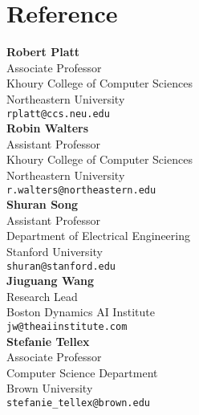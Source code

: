 \documentclass{article}
\begin{document}
\section*{Reference}
\vspace{0.5cm}
\textbf{Robert Platt}\\
Associate Professor\\
Khoury College of Computer Sciences\\
Northeastern University\\
\texttt{rplatt@ccs.neu.edu}\\

\textbf{Robin Walters}\\
Assistant Professor\\
Khoury College of Computer Sciences\\
Northeastern University\\
\texttt{r.walters@northeastern.edu}\\

\textbf{Shuran Song}\\
Assistant Professor\\
Department of Electrical Engineering\\
Stanford University\\
\texttt{shuran@stanford.edu}\\

\textbf{Jiuguang Wang}\\
Research Lead\\
Boston Dynamics AI Institute\\
\texttt{jw@theaiinstitute.com}\\

\textbf{Stefanie Tellex}\\
Associate Professor\\
Computer Science Department\\
Brown University\\
\texttt{stefanie\_tellex@brown.edu}
\end{document}
